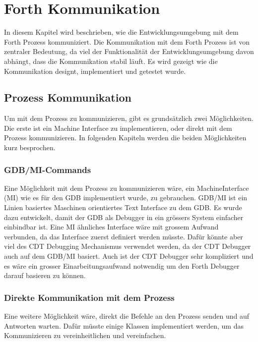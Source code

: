 \chapter{Forth Kommunikation}
\label{forthcommunication}

In diesem Kapitel wird beschrieben, wie die Entwicklungsumgebung mit dem Forth Prozess kommuniziert. Die Kommunikation mit dem Forth Prozess ist von zentraler Bedeutung, da viel der Funktionalität der Entwicklungsumgebung davon abhängt, dass die Kommunikation stabil läuft. Es wird gezeigt wie die Kommunikation designt, implementiert und getestet wurde.

\section{Prozess Kommunikation}
Um mit dem Prozess zu kommunizieren, gibt es grundsätzlich zwei Möglichkeiten. Die erste ist ein Machine Interface zu implementieren, oder direkt mit dem Prozess kommunizieren. In folgenden Kapiteln werden die beiden Möglichkeiten kurz besprochen.

\subsection{GDB/MI-Commands}

Eine Möglichkeit mit dem Prozess zu kommunizieren wäre, ein MachineInterface (MI) wie es für den GDB implementiert wurde, zu gebrauchen. GDB/MI ist ein Linien basiertes Maschinen orientiertes Text Interface zu dem GDB. Es wurde dazu entwickelt, damit der GDB als Debugger in ein grössers System einfacher einbindbar ist.\cite{gdb} Eine MI ähnliches Interface wäre mit grossem Aufwand verbunden, da das Interface zuerst definiert werden müsste. Dafür könnte aber viel des CDT Debugging Mechanismus verwendet werden, da der CDT Debugger auch auf dem GDB/MI basiert. Auch ist der CDT Debugger sehr kompliziert\cite{mieclipse} und es wäre ein grosser Einarbeitungsaufwand notwendig um den Forth Debugger darauf basieren zu können.\cite{mieclipse}

\subsection{Direkte Kommunikation mit dem Prozess}

Eine weitere Möglichkeit wäre, direkt die Befehle an den Prozess senden und auf Antworten warten. Dafür müsste einige Klassen implementiert werden, um das Kommunizieren zu vereinheitlichen und vereinfachen.

